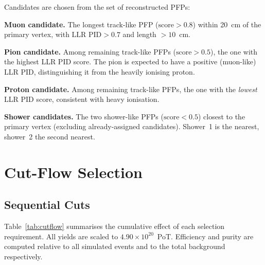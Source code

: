 \documentclass[12pt,a4paper]{article}
\begin{document}
Candidates are chosen from the set of reconstructed PFPs:

\textbf{Muon candidate.}  The longest track-like PFP ($\text{score} > 0.8$)
within 20~cm of the primary vertex, with $\text{LLR PID} > 0.7$ and
length $> 10$~cm.

\textbf{Pion candidate.}  Among remaining track-like PFPs
($\text{score} > 0.5$), the one with the highest LLR PID score.
The pion is expected to have a positive (muon-like) LLR PID,
distinguishing it from the heavily ionising proton.

\textbf{Proton candidate.}  Among remaining track-like PFPs, the one
with the \emph{lowest} LLR PID score, consistent with heavy ionisation.

\textbf{Shower candidates.}  The two shower-like PFPs ($\text{score} < 0.5$)
closest to the primary vertex (excluding already-assigned candidates).
Shower~1 is the nearest, shower~2 the second nearest.

\section{Cut-Flow Selection}

\subsection{Sequential Cuts}

Table~\ref{tab:cutflow} summarises the cumulative effect of each selection
requirement.  All yields are scaled to $4.90 \times 10^{20}$~PoT.
Efficiency and purity are computed relative to all simulated events and
to the total background respectively.
\end{document}
